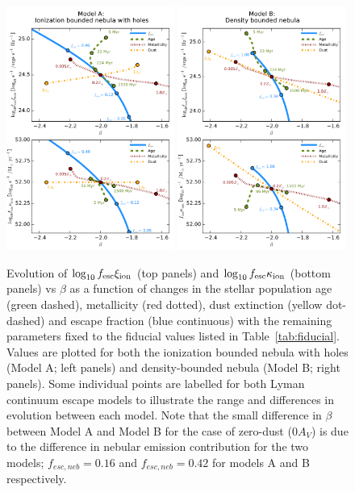 \begin{figure}
  \includegraphics[width=0.49\textwidth]{plots/Fig7a.pdf}
  \includegraphics[width=0.49\textwidth]{plots/Fig7b.pdf}
  \caption[Evolution of $\log_{10}f_{\rm{esc}}\xi_{\rm{ion}}$ (top panels) and $\log_{10}f_{\rm{esc}}\kappa_{\rm{ion}}$ (bottom panels) vs $\beta$ as a function of changes in the stellar population age (green dashed), metallicity (red dotted), dust extinction (yellow dot-dashed) and escape fraction (blue continuous) with the remaining parameters fixed to the fiducial values listed in Table~\ref{tab:fiducial}.]{Evolution of $\log_{10}f_{\rm{esc}}\xi_{\rm{ion}}$ (top panels) and $\log_{10}f_{\rm{esc}}\kappa_{\rm{ion}}$ (bottom panels) vs $\beta$ as a function of changes in the stellar population age (green dashed), metallicity (red dotted), dust extinction (yellow dot-dashed) and escape fraction (blue continuous) with the remaining parameters fixed to the fiducial values listed in Table~\ref{tab:fiducial}. Values are plotted for both the ionization bounded nebula with holes (Model A; left panels) and density-bounded nebula (Model B; right panels). Some individual points are labelled for both Lyman continuum escape models to illustrate the range and differences in evolution between each model. Note that the small difference in $\beta$ between Model A and Model B for the case of zero-dust ($0 A_{V}$) is due to the difference in nebular emission contribution for the two models; $f_{esc,neb} = 0.16$ and $f_{esc,neb} = 0.42$ for models A and B respectively.}

\end{figure}
